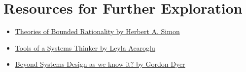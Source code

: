 \section*{Resources for Further Exploration}
\begin{itemize}
\item \href{http://innovbfa.viabloga.com/files/Herbert_Simon___theories_of_bounded_rationality___1972.pdf}{Theories of Bounded Rationality by Herbert A. Simon}
\item \href{https://medium.com/disruptive-design/tools-for-systems-thinkers-the-6-fundamental-concepts-of-systems-thinking-379cdac3dc6a}{Tools of a Systems Thinker by Leyla Acaroglu}
\item \href{http://www.afscet.asso.fr/resSystemica/Crete02/Dyer.pdf}{Beyond Systems Design as we know it? by Gordon Dyer}
\end{itemize}


